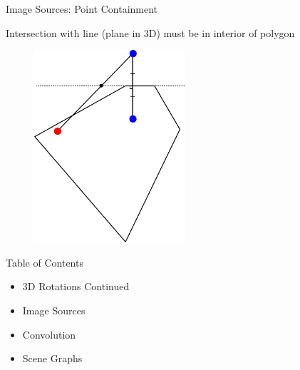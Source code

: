 \documentclass{beamer}
\begin{document}
\begin{frame}{Image Sources: Point Containment}

Intersection with line (plane in 3D) must be in interior of polygon

\begin{figure}[t]
	\centering
    \includegraphics[width=0.5\textwidth]{ImageSourcesInsideSegment1.pdf}
\end{figure}

\end{frame}

\begin{frame}{Table of Contents}
\begin{itemize}[label=$\vartriangleright$]
	\item 3D Rotations Continued
    \item Image Sources
\end{itemize}
\begin{itemize}[label=$\blacktriangleright$]
	\item Convolution
\end{itemize}
\begin{itemize}[label=$\vartriangleright$]
	\item Scene Graphs
\end{itemize}

\end{frame}
\end{document}
